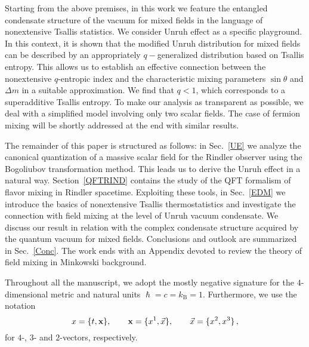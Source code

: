 \documentclass[floats,prd,aps,amssymb,nofootinbib,showkeys]{revtex4}
\begin{document}
Starting from the above premises, in this work
we feature the entangled condensate structure of the vacuum
for mixed fields in the language of nonextensive Tsallis statistics.
We consider Unruh effect as a specific playground. 
In this context, it is shown that the modified Unruh 
distribution for mixed fields can be described by
an appropriately $q-$generalized distribution
based on Tsallis entropy.
This allows us to establish an effective connection
between the nonextensive $q$-entropic index
and the characteristic mixing parameters $\sin\theta$ and $\Delta m$
in a suitable approximation.  We find that $q<1$, 
which corresponds to a superadditive Tsallis entropy.
To make our analysis as transparent as possible, we deal with a
simplified model involving only two scalar
fields. The case of fermion mixing will be shortly 
addressed at the end with similar results.

The remainder of this paper is structured as follows: in Sec.~\ref{UE}
we analyze the canonical quantization of a massive scalar field
for the Rindler observer using the Bogoliubov transformation method. This leads us to derive the Unruh effect in a natural way.
Section~\ref{QFTRIND} contains 
the study of the QFT formalism of flavor mixing
in Rindler spacetime. Exploiting these tools, 
in Sec.~\ref{EDM} we introduce the basics
of nonextensive Tsallis thermostatistics and
investigate the connection with field mixing
at the level of Unruh vacuum condensate.
We discuss our result in relation with the
complex condensate structure acquired by the 
quantum vacuum for mixed fields.
Conclusions and outlook are summarized
in Sec.~\ref{Conc}. The work ends with an Appendix
devoted to review the theory of
field mixing in Minkowski background.

Throughout all the manuscript, we adopt the
mostly negative signature
for the $4$-dimensional metric
and natural units $\hslash=c=k_{\mathrm B}=1$. Furthermore, 
we use the notation
\begin{equation}
\label{notation}
x=\{t,\textbf{x}\},\qquad {\bf {x}}=\{x^1,\vec{x}\},\qquad \vec{x}=\{x^2,x^3\}\,, 
\end{equation}
for $4$-, $3$- and $2$-vectors, respectively.



\maketitle


\setcounter{equation}{0}
\end{document}
